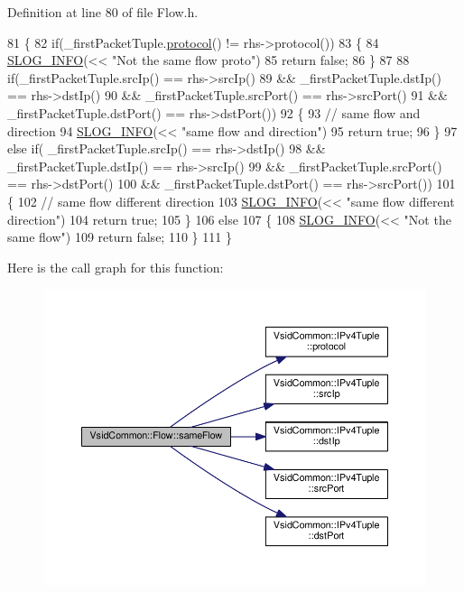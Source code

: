 Definition at line 80 of file Flow.\-h.


\begin{DoxyCode}
81     \{
82         \textcolor{keywordflow}{if}(\_firstPacketTuple.\hyperlink{class_vsid_common_1_1_i_pv4_tuple_a6e05cf962bef53a9f3b1772a04e3878f}{protocol}() != rhs->protocol())
83         \{
84             \hyperlink{_logger_8h_a119c1c29ba35a8db38e2358e41167282}{SLOG\_INFO}(<< \textcolor{stringliteral}{"Not the same flow proto"})
85             return false;
86         \}
87 
88         if(\_firstPacketTuple.srcIp() == rhs->srcIp() 
89                 && \_firstPacketTuple.dstIp() == rhs->dstIp()
90                 && \_firstPacketTuple.srcPort() == rhs->srcPort()
91                 && \_firstPacketTuple.dstPort() == rhs->dstPort())
92         \{
93             \textcolor{comment}{// same flow and direction}
94             \hyperlink{_logger_8h_a119c1c29ba35a8db38e2358e41167282}{SLOG\_INFO}(<< \textcolor{stringliteral}{"same flow and direction"})
95             return true;
96         \}
97         else if( \_firstPacketTuple.srcIp() == rhs->dstIp() 
98                 && \_firstPacketTuple.dstIp() == rhs->srcIp()
99                 && \_firstPacketTuple.srcPort() == rhs->dstPort()
100                 && \_firstPacketTuple.dstPort() == rhs->srcPort())
101         \{
102             \textcolor{comment}{// same flow different direction}
103             \hyperlink{_logger_8h_a119c1c29ba35a8db38e2358e41167282}{SLOG\_INFO}(<< \textcolor{stringliteral}{"same flow different direction"})
104             return true;
105         \}
106         else
107         \{
108             \hyperlink{_logger_8h_a119c1c29ba35a8db38e2358e41167282}{SLOG\_INFO}(<< \textcolor{stringliteral}{"Not the same flow"})
109             return false;
110         \}
111     \}
\end{DoxyCode}


Here is the call graph for this function\-:
\nopagebreak
\begin{figure}[H]
\begin{center}
\leavevmode
\includegraphics[width=350pt]{class_vsid_common_1_1_flow_a85284a063d691f0c54453695255fe6db_cgraph}
\end{center}
\end{figure}




